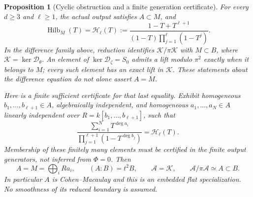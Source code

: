 \documentclass[10pt,fleqn]{article}
\numberwithin{equation}{section}
\newtheorem{proposition}[theorem]{Proposition}
\newcommand{\Hilb}{\operatorname{Hilb}}
\begin{document}
\begin{proposition}[Cyclic obstruction and a finite generation certificate]
\label{v8r10:mixed:certificate}
For every $d\ge3$ and $\ell\ge1$, the actual output satisfies $A\subset M$,
and
\[
 \Hilb_M(T)=\mathcal H_\ell(T):=
       \frac{1-T+T^{\ell+1}}{(1-T)\prod_{j=1}^{\ell}(1-T^j)}.
\]
In the difference family above, reduction identifies
$\mathscr K/\pi\mathscr K$ with $M\subset B$, where
$\mathscr K=\ker\mathscr D_\theta$.  An element of
$\ker\mathscr D_\zeta=S_0$ admits a lift modulo $\pi^2$ exactly when
it belongs to $M$; every such element has an exact lift in $\mathscr K$.
These statements about the difference equation do not alone assert $A=M$.

Here is a finite sufficient certificate for that last equality.
Exhibit homogeneous $b_1,\ldots,b_{\ell+1}\in A$,
algebraically independent, and homogeneous
$a_1,\ldots,a_N\in A$ linearly independent over
$R=k[b_1,\ldots,b_{\ell+1}]$, such that
\[
 \frac{\sum_{i=1}^N T^{\deg a_i}}
      {\prod_{j=1}^{\ell+1}(1-T^{\deg b_j})}=\mathcal H_\ell(T).
\]
Membership of these finitely many elements must be certified in the
finite output generators, not inferred from $\Phi=0$.  Then
\[
 A=M=\bigoplus_i Ra_i,\qquad (A:B)=t^2B,
 \qquad \mathscr A=\mathscr K,\qquad
 \mathscr A/\pi\mathscr A\simeq A\subset B.
\]
In particular $A$ is Cohen--Macaulay and this is an embedded flat
specialization.  No smoothness of its reduced boundary is assumed.
\end{proposition}
\end{document}
